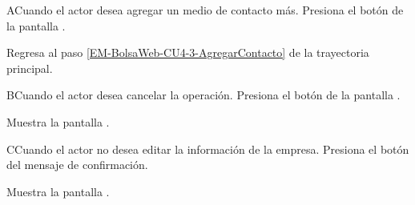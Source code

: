 \begin{UCtrayectoriaA}{A}{Cuando el actor desea agregar un medio de contacto más.}
	\UCpaso [\UCactor] Presiona el botón \IUbutton{+} de la pantalla . 

	\UCpaso Regresa al paso \ref{EM-BolsaWeb-CU4-3-AgregarContacto} de la trayectoria principal.
\end{UCtrayectoriaA}

\begin{UCtrayectoriaA}{B}{Cuando el actor desea cancelar la operación.}
	\UCpaso [\UCactor] Presiona el botón  de la pantalla . 

	\UCpaso Muestra la pantalla .
\end{UCtrayectoriaA}

\begin{UCtrayectoriaA}{C}{Cuando el actor no desea editar la información de la empresa.}
	\UCpaso [\UCactor] Presiona el botón  del mensaje de confirmación.

	\UCpaso Muestra la pantalla . 
\end{UCtrayectoriaA}

